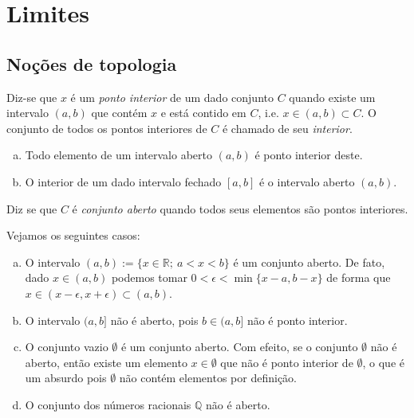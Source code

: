 
\chapter{Limites}\label{cap:limites}

\section{Noções de topologia}

\begin{defn}
  Diz-se que $x$ é um \emph{ponto interior} de um dado conjunto $C$ quando existe um intervalo $(a, b)$ que contém $x$ e está contido em $C$, i.e. $x\in (a, b)\subset C$. O conjunto de todos os pontos interiores de $C$ é chamado de seu \emph{interior}.
\end{defn}

\begin{ex}
  \begin{enumerate}[a)]
  \item Todo elemento de um intervalo aberto $(a, b)$ é ponto interior deste.
  \item O interior de um dado intervalo fechado $[a, b]$ é o intervalo aberto $(a, b)$.
  \end{enumerate}
\end{ex}

\begin{defn}
  Diz se que $C$ é \emph{conjunto aberto} quando todos seus elementos são pontos interiores.
\end{defn}

\begin{ex}\label{ex:conjunto_aberto}
  Vejamos os seguintes casos:
  \begin{enumerate}[a)]
  \item O intervalo $(a, b) := \{x\in\mathbb{R};~a<x<b\}$ é um conjunto aberto. De fato, dado $x\in (a, b)$ podemos tomar $0 < \epsilon < \min\{x-a,b-x\}$ de forma que $x\in (x-\epsilon, x+\epsilon)\subset (a, b)$.
  \item O intervalo $(a, b]$ não é aberto, pois $b\in (a, b]$ não é ponto interior.
  \item O conjunto vazio $\emptyset$ é um conjunto aberto. Com efeito, se o conjunto $\emptyset$ não é aberto, então existe um elemento $x\in\emptyset$ que não é ponto interior de $\emptyset$, o que é um absurdo pois $\emptyset$ não contém elementos por definição.
  \item O conjunto dos números racionais $\mathbb{Q}$ não é aberto.
  \end{enumerate}
\end{ex}

